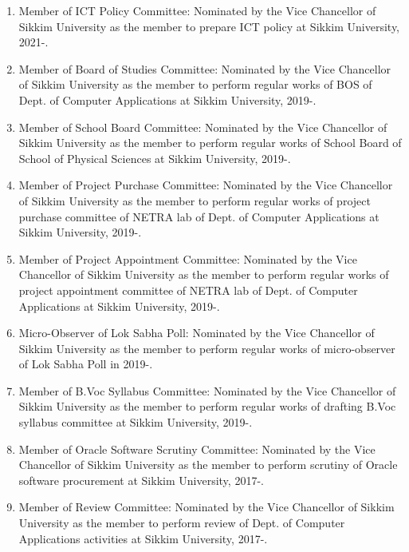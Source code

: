 \documentclass[11pt,a4paper]{moderncv}
\begin{document}
\begin{adjustwidth}{6em}{0pt}
\begin{enumerate}
		\item Member of ICT Policy Committee: Nominated by the Vice Chancellor of Sikkim University as the member to prepare ICT policy at Sikkim University, 2021-.
		
		\item Member of Board of Studies Committee: Nominated by the Vice Chancellor of Sikkim University as the member to perform regular works of BOS of Dept. of Computer Applications at Sikkim University, 2019-.
		
		\item Member of School Board Committee: Nominated by the Vice Chancellor of Sikkim University as the member to perform regular works of School Board of School of Physical Sciences at Sikkim University, 2019-.
		
		\item Member of Project Purchase Committee: Nominated by the Vice Chancellor of Sikkim University as the member to perform regular works of project purchase committee of NETRA lab of Dept. of Computer Applications at Sikkim University, 2019-.
		
		\item Member of Project Appointment Committee: Nominated by the Vice Chancellor of Sikkim University as the member to perform regular works of project appointment committee of NETRA lab of Dept. of Computer Applications at Sikkim University, 2019-.
		
		\item Micro-Observer of Lok Sabha Poll: Nominated by the Vice Chancellor of Sikkim University as the member to perform regular works of micro-observer of Lok Sabha Poll in 2019-.
		
		\item Member of B.Voc Syllabus Committee: Nominated by the Vice Chancellor of Sikkim University as the member to perform regular works of drafting B.Voc syllabus committee at Sikkim University, 2019-.
		
		\item Member of Oracle Software Scrutiny Committee: Nominated by the Vice Chancellor of Sikkim University as the member to perform scrutiny of Oracle software procurement at Sikkim University, 2017-.
		
		\item Member of Review Committee: Nominated by the Vice Chancellor of Sikkim University as the member to perform review of Dept. of Computer Applications activities at Sikkim University, 2017-.
		

\end{enumerate}
\end{adjustwidth}
\end{document}
